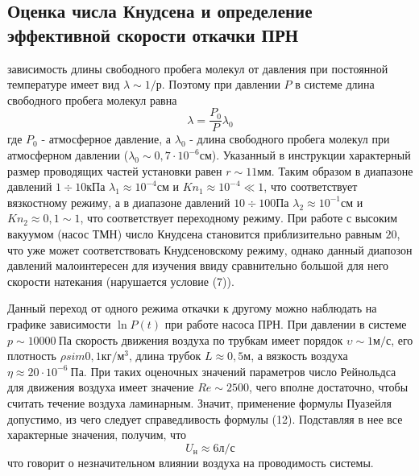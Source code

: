 \documentclass[a4paper,12pt]{article}
\theoremstyle{plain} %
\theoremstyle{definition} %
\theoremstyle{remark} %
\begin{document}
\subsection{Оценка числа Кнудсена и определение эффективной скорости откачки ПРН}
зависимость длины свободного пробега молекул от давления при постоянной температуре имеет вид $\lambda \sim 1/р$. Поэтому при давлении $P$ в системе длина свободного пробега молекул равна
\[\lambda = \frac{P_0}{P}\lambda_0\]
где $P_0$ - атмосферное давление, а $\lambda_0$ - длина свободного пробега молекул при атмосферном давлении ($\lambda_0 \sim 0,7 \cdot 10^{-6} \text{см}$). Указанный в инструкции характерный размер проводящих частей установки равен $r \sim 11 \text{мм}$. Таким образом в диапазоне давлений $1 \div 10 \text{кПа}$ $\lambda_1 \approx10^{-4} \text{см}$ и ${Kn}_1 \approx 10^{-4} \ll 1$, что соответствует вязкостному режиму, а в диапазоне давлений $10 \div 100 \text{Па}$ $\lambda_2 \approx 10^{-1} \text{см}$ и ${Kn}_2 \approx 0,1 \sim 1$, что соответствует переходному режиму. При работе с высоким вакуумом (насос ТМН) число Кнудсена становится приблизительно равным $20$, что уже может соответствовать Кнудсеновскому режиму, однако данный диапозон давлений малоинтересен для изучения ввиду сравнительно большой для него скорости натекания (нарушается условие (7)).

Данный переход от одного режима откачки к другому можно наблюдать на графике зависимости $\ln P(t)$ при работе насоса ПРН. При давлении в системе $p \sim 10000\ \text{Па}$ скорость движения воздуха по трубкам имеет порядок $\upsilon  \sim 1 \text{м}/\text{с}$, его плотность $\rho sim 0,1 \text{кг}/\text{м}^3$, длина трубок $L \approx 0, 5 \text{м}$, а вязкость воздуха $
\eta \approx 20\cdot 10^{-6}\ \text{Па}$. При таких оценочных значений параметров число Рейнольдса для движения воздуха имеет значение $Re \sim 2500$, чего вполне достаточно, чтобы считать течение воздуха ламинарным. Значит, применение формулы Пуазейля допустимо, из чего следует справедливость формулы (12). Подставляя в нее все характерные значения, получим, что
\[U_\text{н} \approx 6 \text{л}/\text{с}\]
что говорит о незначительном влиянии воздуха на проводимость системы.
\end{document}
